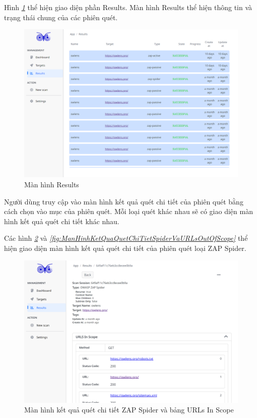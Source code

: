 \tab \tab Hình \textit{\ref{fig:ManHinhResults} } thể hiện giao diện phần Results.
Màn hình Results thể hiện thông tin và trạng thái chung của các phiên quét.

\begin{figure}[H]
      \centering
      \includegraphics[width=\textwidth]{applied-thesis-chapters/chapter-6/Màn hình Results.png}
      \caption{Màn hình Results}
      \label{fig:ManHinhResults}
\end{figure}

Người dùng truy cập vào màn hình kết quả quét chi tiết của phiên quét bằng cách chọn vào mục của phiên quét.
Mỗi loại quét khác nhau sẽ có giao diện màn hình kết quả quét chi tiết khác nhau.

Các hình \textit{\ref{fig:ManHinhKetQuaQuetChiTietSpiderVaURLsInScope} } 
và \textit{\ref{fig:ManHinhKetQuaQuetChiTietSpiderVaURLsOutOfScope} } 
thể hiện giao diện màn hình kết quả quét chi tiết của phiên quét loại ZAP Spider.

\begin{figure}[H]
      \centering
      \includegraphics[width=\textwidth]{applied-thesis-chapters/chapter-6/Màn hình kết quả quét chi tiết ZAP Spider và bảng URLs In Scope.png}
      \caption{Màn hình kết quả quét chi tiết ZAP Spider và bảng URLs In Scope}
      \label{fig:ManHinhKetQuaQuetChiTietSpiderVaURLsInScope}
\end{figure}

